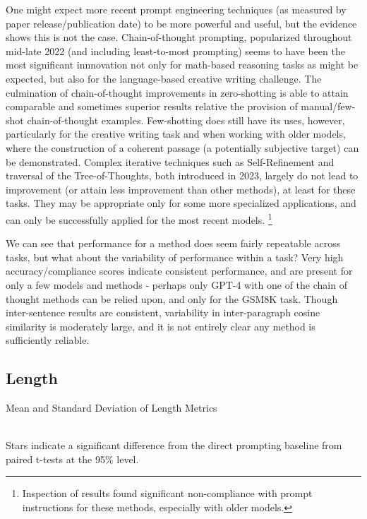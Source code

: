 \documentclass[11pt]{article}
\begin{document}
One might expect more recent prompt engineering techniques (as measured by paper release/publication date) to be more powerful and useful, but the evidence shows this is not the case. Chain-of-thought prompting, popularized throughout mid-late 2022 (and including least-to-most prompting) seems to have been the most significant innnovation not only for math-based reasoning tasks as might be expected, but also for the language-based creative writing challenge. The culmination of chain-of-thought improvements in zero-shotting is able to attain comparable and sometimes superior results relative the provision of manual/few-shot chain-of-thought examples. Few-shotting does still have its uses, however, particularly for the creative writing task and when working with older models, where the construction of a coherent passage (a potentially subjective target) can be demonstrated. Complex iterative techniques such as Self-Refinement and traversal of the Tree-of-Thoughts, both introduced in 2023, largely do not lead to improvement (or attain less improvement than other methods), at least for these tasks. They may be appropriate only for some more specialized applications, and can only be successfully applied for the most recent models. \footnote{Inspection of results found significant non-compliance with prompt instructions for these methods, especially with older models.}

We can see that performance for a method does seem fairly repeatable across tasks, but what about the variability of performance within a task? Very high accuracy/compliance scores indicate consistent performance, and are present for only a few models and methods - perhaps only GPT-4 with one of the chain of thought methods can be relied upon, and only for the GSM8K task. Though inter-sentence results are consistent, variability in inter-paragraph cosine similarity is moderately large, and it is not entirely clear any method is sufficiently reliable.

\subsection*{Length}

\begin{table}
  \caption{Mean and Standard Deviation of Length Metrics}
  \centering
  \tiny
    
  \label{tab:avg_length_metrics_pivot}
  \\[10pt] \footnotesize Stars indicate a significant difference from the direct prompting baseline from paired t-tests at the 95\% level.
\end{table}
\end{document}
